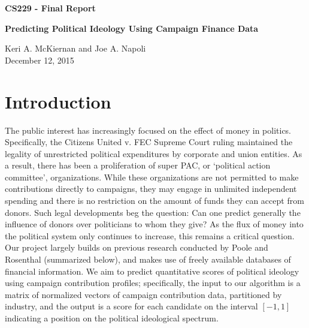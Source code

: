 \documentclass[10]{article}
\begin{document}
\begin{center}
\huge{\textbf{CS229 - Final Report}} \\
\end{center}
\begin{center}
\huge{\textbf{Predicting Political Ideology Using Campaign Finance Data}} \\
\end{center}
\begin{center}
\large{Keri A. McKiernan and Joe A. Napoli \\
\vspace{.25em}
December 12, 2015}
\end{center}
\section*{Introduction}

\noindent The public interest has increasingly focused on the effect of money in politics. Specifically, the Citizens United v. FEC Supreme Court ruling maintained the legality of unrestricted political expenditures by corporate and union entities. As a result, there has been a proliferation of super PAC, or `political action committee',  organizations. While these organizations are not permitted to make contributions directly to campaigns, they may engage in unlimited independent spending and there is no restriction on the amount of funds they can accept from donors. Such legal developments beg the question: Can one predict generally the influence of donors over politicians to whom they give? As the flux of money into the political system only continues to increase, this remains a critical question. Our project largely builds on previous research conducted by Poole and Rosenthal (summarized below), and makes use of freely available databases of financial information. We aim to predict quantitative scores of political ideology using campaign contribution profiles; specifically, the input to our algorithm is a matrix of normalized vectors of campaign contribution data, partitioned by industry, and the output is a score for each candidate on the interval $[-1,1]$ indicating a position on the political ideological spectrum.
\end{document}
